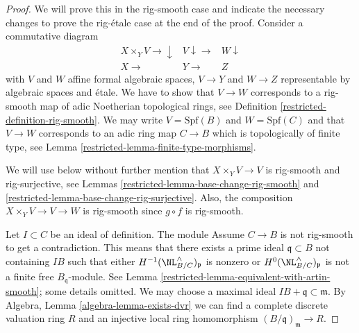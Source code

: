 \begin{proof}

We will prove this in the rig-smooth case and indicate the necessary
changes to prove the rig-\'etale case at the end of the proof.
Consider a commutative diagram
$$
\begin{array}{ccc}X \times_Y V \longrightarrow\downarrow & V \downarrow\longrightarrow & W \downarrow \\ X \longrightarrow & Y \longrightarrow & Z\end{array}
$$
with $V$ and $W$ affine formal algebraic spaces, $V \to Y$ and $W \to Z$
representable by algebraic spaces and \'etale. We have to show that
$V \to W$ corresponds to a rig-smooth map of adic Noetherian topological
rings, see Definition \ref{restricted-definition-rig-smooth}.
We may write $V = \text{Spf}(B)$ and $W = \text{Spf}(C)$ and that
$V \to W$ corresponds to an adic ring map $C \to B$ which is topologically
of finite type, see Lemma \ref{restricted-lemma-finite-type-morphisms}.

\medskip\noindent
We will use below without further mention that $X \times_Y V \to V$
is rig-smooth and rig-surjective, see
Lemmas \ref{restricted-lemma-base-change-rig-smooth} and
\ref{restricted-lemma-base-change-rig-surjective}.
Also, the composition $X \times_Y V \to V \to W$ is rig-smooth
since $g \circ f$ is rig-smooth.

\medskip\noindent
Let $I \subset C$ be an ideal of definition. The module
Assume $C \to B$ is not rig-smooth to get a contradiction.
This means that there exists a prime ideal $\mathfrak q \subset B$
not containing $IB$ such that either $H^{-1}(\NL_{B/C}^\wedge)_\mathfrak p$
is nonzero or $H^0(\NL_{B/C}^\wedge)_\mathfrak p$ is not a finite free
$B_\mathfrak q$-module. See
Lemma \ref{restricted-lemma-equivalent-with-artin-smooth}; some details
omitted. We may choose a maximal ideal
$IB + \mathfrak q \subset \mathfrak m$. By
Algebra, Lemma \ref{algebra-lemma-exists-dvr}
we can find a complete discrete valuation ring $R$ and an injective
local ring homomorphism $(B/\mathfrak q)_\mathfrak m \to R$.


\end{proof}
